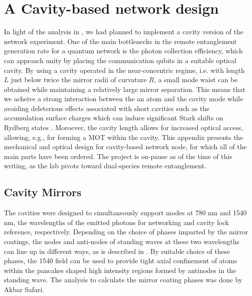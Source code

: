 \chapter{A Cavity-based network design}\label{ch:cavitynode}

In light of the analysis in \cite{Young2022}, we had planned to implement a cavity version of the network experiment. One of the main bottlenecks in the remote entanglement generation rate for a quantum network is the photon collection efficiency, which can approach unity by placing the communication qubits in a suitable optical cavity. By using a cavity operated in the near-concentric regime, i.e. with length $L$ just below twice the mirror radii of curvature $R$, a small mode waist can be obtained while maintaining a relatively large mirror separation. This means that we acheive a strong interaction between the an atom and the cavity mode while avoiding deleterious effects associated with short cavities such as the accumulation surface charges which can induce significant Stark shifts on Rydberg states \cite{Bohorquez2023}. Moroever, the cavity length allows for increased optical access, allowing, e.g., for forming a MOT within the cavity. This appendix presents the mechanical and optical design for cavity-based network node, for which all of the main parts have been ordered. The project is on-pause as of the time of this writing, as the lab pivots toward dual-species remote entanglement.

\section{Cavity Mirrors}\label{sec:cavmirrors}

The cavities were designed to simultaneously support modes at 780 nm and 1540 nm, the wavelengths of the emitted photons for networking and cavity lock reference, respectively. Depending on the choice of phases imparted by the mirror coatings, the nodes and anti-nodes of standing waves at these two wavelengths can line up in different ways, as is described in \cite{garcia2020overlapping}. By suitable choice of these phases, the 1540 field can be used to provide tight axial confinement of atoms within the pancakes shaped high intensity regions formed by antinodes in the standing wave. The analysis to calculate the mirror coating phases was done by Akbar Safari.

